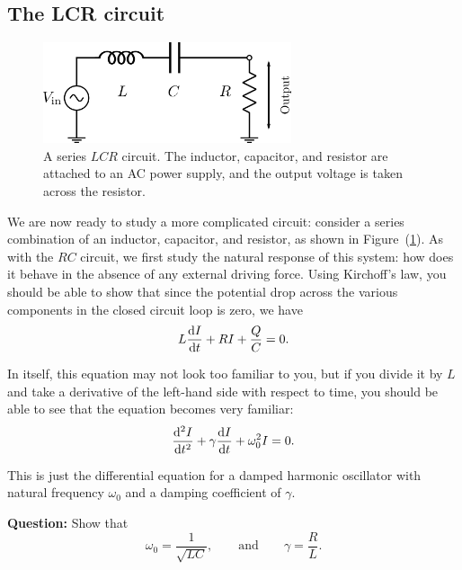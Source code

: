 \subsection*{The LCR circuit}

\begin{figure}[!htb]
    \centering
    \includegraphics[width=0.65\textwidth]{figs/electronics-circuits/LCRSeries.png}
    \caption{A series $LCR$ circuit. The inductor, capacitor, and resistor are attached to an AC power supply, and the output voltage is taken across the resistor. }
    \label{fig:lcr-series}
\end{figure}

We are now ready to study a more complicated circuit: consider a series combination of an inductor, capacitor, and resistor, as shown in Figure~(\ref{fig:lcr-series}). As with the $RC$ circuit, we first study the natural response of this system: how does it behave in the absence of any external driving force. Using Kirchoff's law, you should be able to show that since the potential drop across the various components in the closed circuit loop is zero, we have
\begin{equation}
    L \dv{I}{t} + R I + \frac{Q}{C} = 0.
\end{equation}

In itself, this equation may not look too familiar to you, but if you divide it by $L$ and take a derivative of the left-hand side with respect to time, you should be able to see that the equation becomes very familiar:
\begin{equation}
    \dv[2]{I}{t} + \gamma \dv{I}{t} + \omega_0^2 I = 0.
\end{equation}

This is just the differential equation for a damped harmonic oscillator with natural frequency $\omega_0$ and a damping coefficient of $\gamma$.

\begin{question}
    \textbf{Question:} Show that 
    \begin{equation}
        \omega_0 = \frac{1}{\sqrt{LC}}, \quad \quad \text{and} \quad \quad \gamma = \frac{R}{L}.
    \end{equation}
\end{question}

